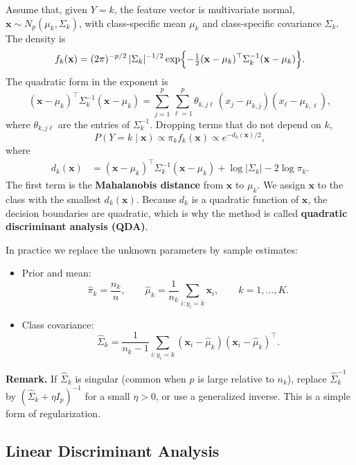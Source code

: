 \documentclass[
]{book}
\providecommand{\tightlist}{%
  \setlength{\itemsep}{0pt}\setlength{\parskip}{0pt}}
\begin{document}
Assume that, given \(Y = k\), the feature vector is multivariate normal,
\(\mathbf{x} \sim N_p(\mu_k, \Sigma_k)\),
with class-specific mean \(\mu_k\) and class-specific covariance \(\Sigma_k\). The density is
\[
f_k(\mathbf{x})
= (2\pi)^{-p/2} \, |\Sigma_k|^{-1/2}
\exp\Bigl\{ -\tfrac12 (\mathbf{x} - \mu_k)^\top \Sigma_k^{-1} (\mathbf{x} - \mu_k) \Bigr\}.
\]
The quadratic form in the exponent is
\[
(\mathbf{x} - \mu_k)^\top \Sigma_k^{-1} (\mathbf{x} - \mu_k)
= \sum_{j=1}^{p} \sum_{\ell=1}^{p} \theta_{k,j\ell}\, (x_j - \mu_{k,j})(x_\ell - \mu_{k,\ell}),
\]
where \(\theta_{k,j\ell}\) are the entries of \(\Sigma_k^{-1}\). Dropping terms that do not depend on \(k\),
\[
P(Y = k \mid \mathbf{x}) \propto \pi_k f_k(\mathbf{x}) \propto e^{-d_k(\mathbf{x})/2},
\]
where
\begin{align*}
d_k(\mathbf{x})
&= (\mathbf{x} - \mu_k)^\top \Sigma_k^{-1} (\mathbf{x} - \mu_k) + \log|\Sigma_k| - 2\log \pi_k.
\end{align*}
The first term is the \textbf{Mahalanobis distance} from \(\mathbf{x}\) to \(\mu_k\). We assign \(\mathbf{x}\) to the class with the smallest \(d_k(\mathbf{x})\). Because \(d_k\) is a quadratic function of \(\mathbf{x}\), the decision boundaries are quadratic, which is why the method is called \textbf{quadratic discriminant analysis (QDA)}.

In practice we replace the unknown parameters by sample estimates:

\begin{itemize}
\tightlist
\item
  Prior and mean:
  \[
  \hat{\pi}_k = \frac{n_k}{n}, \qquad
  \hat{\mu}_k = \frac{1}{n_k} \sum_{i: y_i = k} \mathbf{x}_i, \qquad k = 1, \ldots, K.
  \]
\item
  Class covariance:
  \[
  \hat{\Sigma}_k = \frac{1}{n_k - 1} \sum_{i: y_i = k} (\mathbf{x}_i - \hat{\mu}_k)(\mathbf{x}_i - \hat{\mu}_k)^\top.
  \]
\end{itemize}

\textbf{Remark.} If \(\hat{\Sigma}_k\) is singular (common when \(p\) is large relative to \(n_k\)), replace \(\hat{\Sigma}_k^{-1}\) by \((\hat{\Sigma}_k + \eta I_p)^{-1}\) for a small \(\eta > 0\), or use a generalized inverse. This is a simple form of regularization.

\subsection{Linear Discriminant Analysis}\label{linear-discriminant-analysis}
\end{document}
